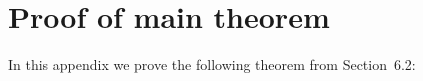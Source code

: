
\section{Proof of main theorem}
\label{app:theorem}

In this appendix we prove the following theorem from
Section~6.2:


